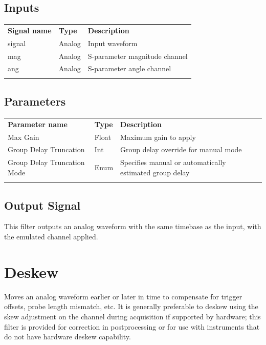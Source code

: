 \FloatBarrier

\subsection{Inputs}

\begin{tabularx}{16cm}{llX}
\thickhline
\textbf{Signal name} & \textbf{Type} & \textbf{Description} \\
\thickhline
signal & Analog & Input waveform \\
\thinhline
mag & Analog & S-parameter magnitude channel \\
\thinhline
ang & Analog & S-parameter angle channel \\
\thickhline
\end{tabularx}

\subsection{Parameters}

\begin{tabularx}{16cm}{llX}
\thickhline
\textbf{Parameter name} & \textbf{Type} & \textbf{Description} \\
\thickhline
Max Gain & Float & Maximum gain to apply\\
\thinhline
Group Delay Truncation & Int & Group delay override for manual mode\\
\thinhline
Group Delay Truncation Mode & Enum & Specifies manual or automatically estimated group delay\\
\thickhline
\end{tabularx}

\subsection{Output Signal}

This filter outputs an analog waveform with the same timebase as the input, with the emulated channel applied.

\pagebreak
\section{Deskew}
\label{filter:deskew}

Moves an analog waveform earlier or later in time to compensate for trigger offsets, probe length mismatch, etc. It is
generally preferable to deskew using the skew adjustment on the channel during acquisition if supported by hardware;
this filter is provided for correction in postprocessing or for use with instruments that do not have hardware deskew
capability.

